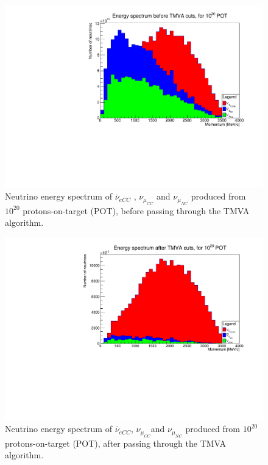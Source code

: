 \begin{figure}[h!]
\centering
\includegraphics[width=.9\textwidth]{figures/NeutrinoChap/ActualNeutrinoEvents.pdf}
\caption{Neutrino energy spectrum of $\bar{\nu}_{eCC}$ , $\nu_{\mu_{CC}}$ and $\nu_{\mu_{NC}}$ produced from $10^{20}$ protons-on-target (POT), before passing through the TMVA algorithm.}
\label{fig:TMVAEspectrumBefore}
\end{figure}


\begin{figure}[h!]
\centering
\includegraphics[width=.9\textwidth]{figures/NeutrinoChap/ActualNeutrinoEventsAfter.pdf}
\caption{Neutrino energy spectrum of $\bar{\nu}_{eCC}$, $\nu_{\mu_{CC}}$and $\nu_{\mu_{NC}}$ produced from $10^{20}$ protons-on-target (POT), after passing through the TMVA algorithm.}
\label{fig:TMVAEspectrumAfter}
\end{figure}

